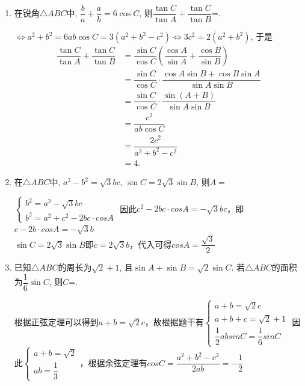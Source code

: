 \begin{enumerate}
    \item 在锐角$\triangle{ABC}$中, $\dfrac{b}{a}+\dfrac{a}{b}=6\cos{C}$, 则$\dfrac{\tan{C}}{\tan{A}}+\dfrac{\tan{C}}{\tan{B}}$=. 
    \begin{jieda}
    $\iff a^2+b^2=6ab\cos{C}=3(a^2+b^2-c^2)\iff3c^2=2(a^2+b^2)$, 
    于是
    \begin{align*}
    \dfrac{\tan{C}}{\tan{A}}+\dfrac{\tan{C}}{\tan{B}}
    & =\dfrac{\sin{C}}{\cos{C}}\left(\dfrac{\cos{A}}{\sin{A}}+\dfrac{\cos{B}}{\sin{B}}\right)\\
    & =\dfrac{\sin{C}}{\cos{C}}\cdot\dfrac{\cos{A}\sin{B}+\cos{B}\sin{A}}{\sin{A}\sin{B}}\\
    & =\dfrac{\sin{C}}{\cos{C}}\cdot\dfrac{\sin(A+B)}{\sin{A}\sin{B}}\\
    & =\dfrac{c^2}{ab\cos{C}}\\
    & =\dfrac{2c^2}{a^2+b^2-c^2}\\
    & =4.
    \end{align*}
    \end{jieda}
    \item 在$\triangle{ABC}$中, $a^2-b^2=\sqrt{3}bc$, $\sin{C}=2\sqrt{3}\sin{B}$, 则$A=$
    \begin{jieda}
    $\left \{\begin{array}{l}
         b^2 = a^2-\sqrt{3}bc  \\
         b^2 = a^2 + c^2 - 2bc \cdot cosA
    \end{array} \right.$
    因此$c^2 - 2bc \cdot cosA = -\sqrt{3}bc$，即$c - 2b\cdot cosA = -\sqrt{3}b$ \\
    $\sin{C}=2\sqrt{3}\sin{B}$即$c = 2\sqrt{3}b$，代入可得$cosA = \dfrac{\sqrt{3}}{2}$
    \end{jieda}
    
    \item 已知$\triangle{ABC}$的周长为$\sqrt{2}+1$, 且$\sin{A}+\sin{B}=\sqrt{2}\sin{C}$. 若$\triangle{ABC}$的面积为$\dfrac{1}{6}\sin{C}$, 则$C$=. 
    \begin{jieda}
    根据正弦定理可以得到$a+b=\sqrt{2}c$，故根据题干有$\left \{ \begin{array}{l}
         a+b=\sqrt{2}c \\
         a+b+c = \sqrt{2}+1 \\
         \dfrac{1}{2}absinC = \dfrac{1}{6}sinC
    \end{array}\right.$
    因此$\left \{ \begin{array}{l}
         a+b =\sqrt{2} \\
         ab = \dfrac{1}{3}
    \end{array}\right.$，根据余弦定理有$cosC = \dfrac{a^2+b^2-c^2}{2ab} = -\dfrac{1}{2}$
    \end{jieda}


\end{enumerate}
